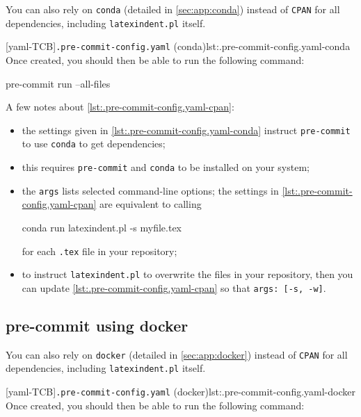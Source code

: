 \documentclass[10pt]{article}
\begin{document}
  You can also rely on \texttt{conda} (detailed in \cref{sec:app:conda}) instead of
  \texttt{CPAN} for all dependencies, including \texttt{latexindent.pl} itself.
    

  [yaml-TCB]{\texttt{.pre-commit-config.yaml} (conda)}{lst:.pre-commit-config.yaml-conda}
  Once created, you should then be able to run the following command:

  \begin{commandshell}
pre-commit run --all-files
\end{commandshell}

  A few notes about \cref{lst:.pre-commit-config.yaml-cpan}:
  \begin{itemize}
   \item the settings given in \cref{lst:.pre-commit-config.yaml-conda} instruct
         \texttt{pre-commit} to use \texttt{conda} to get dependencies;
   \item this requires \texttt{pre-commit} and \texttt{conda} to be installed on your
         system;
   \item the \texttt{args} lists selected command-line options; the settings in
         \cref{lst:.pre-commit-config.yaml-cpan} are equivalent to calling

         \begin{commandshell}
conda run latexindent.pl -s myfile.tex
\end{commandshell}

         for each \texttt{.tex} file in your repository;
   \item to instruct \texttt{latexindent.pl} to overwrite the files in your repository,
         then you can update \cref{lst:.pre-commit-config.yaml-cpan} so that
         \texttt{args: [-s, -w]}.
  \end{itemize}

 \subsection{pre-commit using docker}\label{sec:pre-commit-docker}

  You can also rely on \texttt{docker} (detailed in \cref{sec:app:docker}) instead of
  \texttt{CPAN} for all dependencies, including \texttt{latexindent.pl} itself.
    

  [yaml-TCB]{\texttt{.pre-commit-config.yaml} (docker)}{lst:.pre-commit-config.yaml-docker}
  Once created, you should then be able to run the following command:
\end{document}
